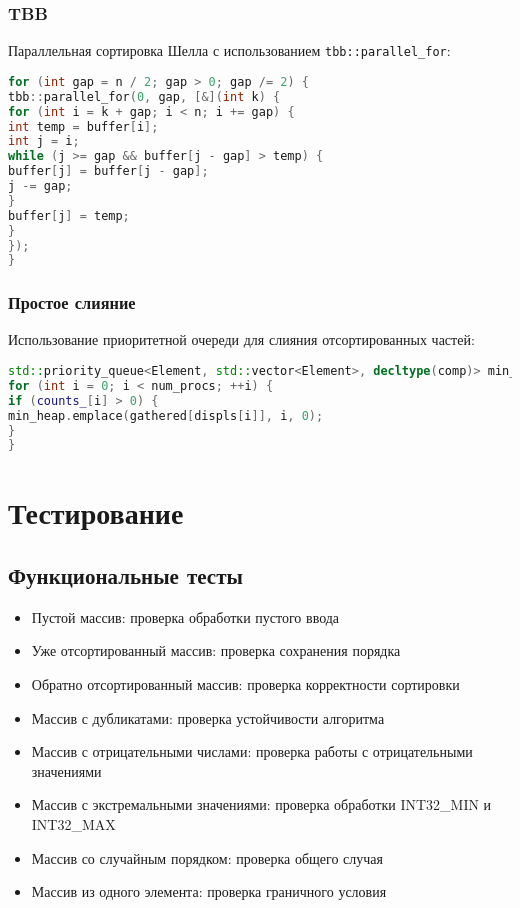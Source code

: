 \documentclass[12pt]{article}
\begin{document}
\subsubsection{TBB}
Параллельная сортировка Шелла с использованием \texttt{tbb::parallel_for}:
\begin{lstlisting}[language=C++, caption=Фрагмент кода TBB]
for (int gap = n / 2; gap > 0; gap /= 2) {
tbb::parallel_for(0, gap, [&](int k) {
for (int i = k + gap; i < n; i += gap) {
int temp = buffer[i];
int j = i;
while (j >= gap && buffer[j - gap] > temp) {
buffer[j] = buffer[j - gap];
j -= gap;
}
buffer[j] = temp;
}
});
}
\end{lstlisting}

\subsubsection{Простое слияние}
Использование приоритетной очереди для слияния отсортированных частей:
\begin{lstlisting}[language=C++, caption=Фрагмент кода простого слияния]
std::priority_queue<Element, std::vector<Element>, decltype(comp)> min_heap(comp);
for (int i = 0; i < num_procs; ++i) {
if (counts_[i] > 0) {
min_heap.emplace(gathered[displs[i]], i, 0);
}
}
\end{lstlisting}

\section{Тестирование}
\subsection{Функциональные тесты}
\begin{itemize}
\item Пустой массив: проверка обработки пустого ввода
\item Уже отсортированный массив: проверка сохранения порядка
\item Обратно отсортированный массив: проверка корректности сортировки
\item Массив с дубликатами: проверка устойчивости алгоритма
\item Массив с отрицательными числами: проверка работы с отрицательными значениями
\item Массив с экстремальными значениями: проверка обработки INT32_MIN и INT32_MAX
\item Массив со случайным порядком: проверка общего случая
\item Массив из одного элемента: проверка граничного условия
\end{itemize}
\end{document}
